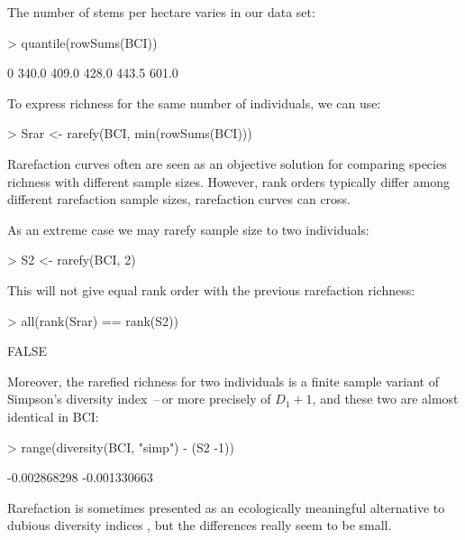 \documentclass[a4paper,10pt,twocolumn]{article}
\begin{document}
The number of stems per hectare varies in our
data set:
\begin{Schunk}
\begin{Sinput}
> quantile(rowSums(BCI))
\end{Sinput}
\begin{Soutput}
   0%   25%   50%   75%  100% 
340.0 409.0 428.0 443.5 601.0 
\end{Soutput}
\end{Schunk}
To express richness for the same number of individuals, we can use:
\begin{Schunk}
\begin{Sinput}
> Srar <- rarefy(BCI, min(rowSums(BCI)))
\end{Sinput}
\end{Schunk}
Rarefaction curves often are seen as an objective solution for
comparing species richness with different sample sizes.  However, rank
orders typically differ among different rarefaction sample sizes,
rarefaction curves can cross.

As an extreme case we may rarefy sample size to two individuals:
\begin{Schunk}
\begin{Sinput}
> S2 <- rarefy(BCI, 2)
\end{Sinput}
\end{Schunk}
This will not give equal rank order with the previous rarefaction
richness:
\begin{Schunk}
\begin{Sinput}
> all(rank(Srar) == rank(S2))
\end{Sinput}
\begin{Soutput}
[1] FALSE
\end{Soutput}
\end{Schunk}
Moreover, the rarefied richness for two individuals is a finite
sample variant of Simpson's diversity index \citep{Hurlbert71}\,--\,or
more precisely of $D_1 + 1$, and these two are almost identical in
BCI:
\begin{Schunk}
\begin{Sinput}
> range(diversity(BCI, "simp") - (S2 -1))
\end{Sinput}
\begin{Soutput}
[1] -0.002868298 -0.001330663
\end{Soutput}
\end{Schunk}
Rarefaction is sometimes presented as an ecologically meaningful
alternative to dubious diversity indices \citep{Hurlbert71}, but the
differences really seem to be small.
\end{document}
